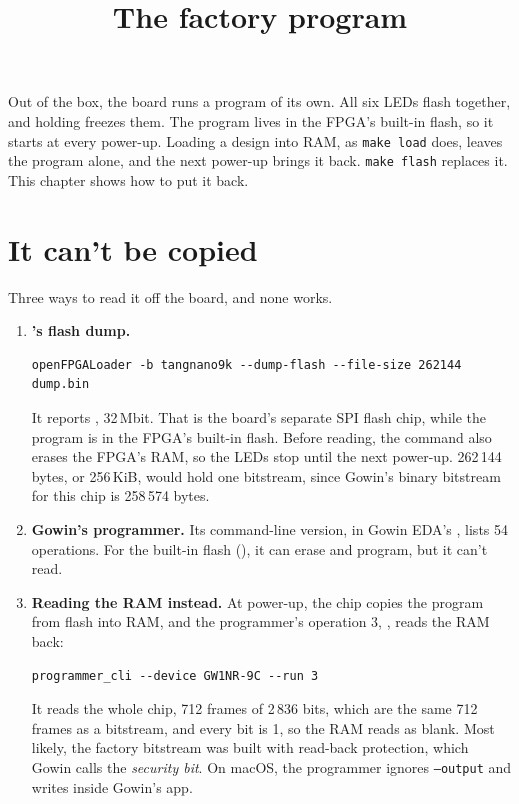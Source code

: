 \documentclass[11pt,a4paper]{article}
\title{The factory program}
\author{}
\date{}
\begin{document}
\maketitle

Out of the box, the board runs a program of its own. All six LEDs flash together, and holding  freezes them. The program lives in the FPGA’s built-in flash, so it starts at every power-up. Loading a design into RAM, as \texttt{make load} does, leaves the program alone, and the next power-up brings it back. \texttt{make flash} replaces it. This chapter shows how to put it back.

\section*{It can’t be copied}

Three ways to read it off the board, and none works.

\begin{enumerate}
  \item \textbf{’s flash dump.}
\begin{verbatim}
openFPGALoader -b tangnano9k --dump-flash --file-size 262144 dump.bin
\end{verbatim}
  It reports , 32\,Mbit. That is the board’s separate SPI flash chip, while the program is in the FPGA’s built-in flash. Before reading, the command also erases the FPGA’s RAM, so the LEDs stop until the next power-up. 262\,144 bytes, or 256\,KiB, would hold one bitstream, since Gowin’s binary bitstream for this chip is 258\,574 bytes.
  \item \textbf{Gowin’s programmer.} Its command-line version,  in Gowin EDA’s , lists 54 operations. For the built-in flash (), it can erase and program, but it can’t read.
  \item \textbf{Reading the RAM instead.} At power-up, the chip copies the program from flash into RAM, and the programmer’s operation 3, , reads the RAM back:
\begin{verbatim}
programmer_cli --device GW1NR-9C --run 3
\end{verbatim}
  It reads the whole chip, 712 frames of 2\,836 bits, which are the same 712 frames as a bitstream, and every bit is 1, so the RAM reads as blank. Most likely, the factory bitstream was built with read-back protection, which Gowin calls the \emph{security bit}. On macOS, the programmer ignores \texttt{--output} and writes  inside Gowin’s app.
\end{enumerate}
\end{document}
